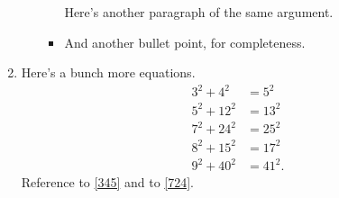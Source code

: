 \documentclass[onesided]{../../ccg-pset}
\begin{document}
\begin{enumerate}
\begin{enumerate}
\begin{itemize}
		Here's another paragraph of the same argument.
		\item And another bullet point, for completeness.
	\end{itemize}
\end{enumerate}
\item Here's a bunch more equations.
\begin{align}
	\label{345}
	3^2 + 4^2 &= 5^2\\
	5^2 + 12^2 &= 13^2\\
	\label{724}
	7^2 + 24^2 &= 25^2\\
	8^2 + 15^2 &= 17^2\\
	9^2 + 40^2 &= 41^2.
\end{align}
Reference to \eqref{345} and to \eqref{724}.
\end{enumerate}
\end{document}
